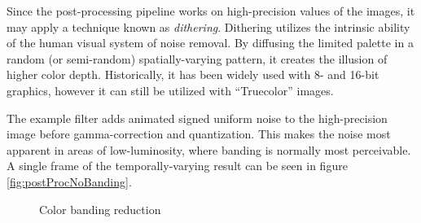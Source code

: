 Since the post-processing pipeline works on high-precision values of the images, it may apply a technique known as \emph{dithering}. Dithering utilizes the intrinsic ability of the human visual system of noise removal. By diffusing the limited palette in a random (or semi-random) spatially-varying pattern, it creates the illusion of higher color depth. Historically, it has been widely used with 8- and 16-bit graphics, however it can still be utilized with ``Truecolor'' images.

The example filter adds animated signed uniform noise to the high-precision image before gamma-correction and quantization. This makes the noise most apparent in areas of low-luminosity, where banding is normally most perceivable. A single frame of the temporally-varying result can be seen in figure \ref{fig:postProcNoBanding}.

\begin{figure}[h!]
  \centering
  \caption[Color banding reduction]{Color banding reduction}
  \label{fig:postProcBandingNoBanding}
\end{figure}
